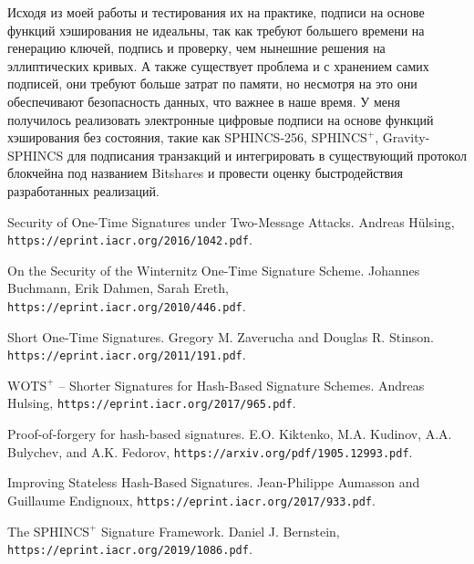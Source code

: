 \documentclass[a4paper, 14pt]{extarticle}
\begin{document}
Исходя из моей работы и тестирования их на практике, подписи на основе функций хэширования не идеальны, так как требуют большего времени на генерацию ключей, подпись и проверку, чем нынешние решения на эллиптических кривых. А также существует проблема и с хранением самих подписей, они требуют больше затрат по памяти, но несмотря на это они обеспечивают безопасность данных, что важнее в наше время. У меня получилось реализовать электронные цифровые подписи на основе функций хэширования без состояния, такие как SPHINCS-256, $\text{SPHINCS}^+$, Gravity-SPHINCS для подписания транзакций и интегрировать в существующий протокол блокчейна под названием Bitshares и провести оценку быстродействия разработанных реализаций.
\newpage

\begin{thebibliography}{9}
    Security of One-Time Signatures under Two-Message Attacks. Andreas Hülsing,
    \texttt{https://eprint.iacr.org/2016/1042.pdf}.
    
    On the Security of the Winternitz One-Time Signature Scheme. Johannes Buchmann, Erik Dahmen, Sarah Ereth,
    \texttt{https://eprint.iacr.org/2010/446.pdf}.

    Short One-Time Signatures. Gregory M. Zaverucha and Douglas R. Stinson.
    \texttt{https://eprint.iacr.org/2011/191.pdf}.

    $\text{WOTS}^{+}$ – Shorter Signatures for Hash-Based Signature Schemes. Andreas Hulsing,
    \texttt{https://eprint.iacr.org/2017/965.pdf}.

    Proof-of-forgery for hash-based signatures. E.O. Kiktenko, M.A. Kudinov, A.A. Bulychev, and A.K. Fedorov,
    \texttt{https://arxiv.org/pdf/1905.12993.pdf}.

    Improving Stateless Hash-Based Signatures. Jean-Philippe Aumasson and Guillaume Endignoux,
    \texttt{https://eprint.iacr.org/2017/933.pdf}.

    The $\text{SPHINCS}^{+}$ Signature Framework. Daniel J. Bernstein,
    \texttt{https://eprint.iacr.org/2019/1086.pdf}.
\end{thebibliography}
\newpage

\end{document}
